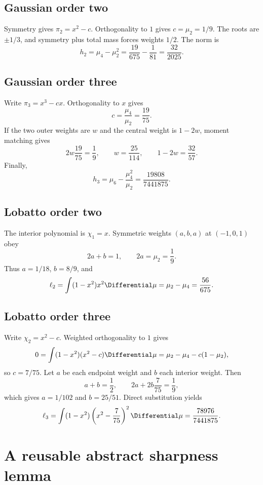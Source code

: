 \documentclass[11pt]{article}
\numberwithin{equation}{section}
\theoremstyle{definition}
\theoremstyle{remark}
\begin{document}
\subsection{Gaussian order two}

Symmetry gives $\pi_2=x^2-c$.  Orthogonality to $1$ gives $c=\mu_2=1/9$.  The roots are $\pm1/3$, and symmetry plus total mass forces weights $1/2$.  The norm is
\[
 h_2=\mu_4-\mu_2^2
 =\frac{19}{675}-\frac1{81}
 =\frac{32}{2025}.
\]

\subsection{Gaussian order three}

Write $\pi_3=x^3-cx$.  Orthogonality to $x$ gives
\[
 c=\frac{\mu_4}{\mu_2}=\frac{19}{75}.
\]
If the two outer weights are $w$ and the central weight is $1-2w$, moment matching gives
\[
 2w\frac{19}{75}=\frac19,
 \qquad
 w=\frac{25}{114},
 \qquad
 1-2w=\frac{32}{57}.
\]
Finally,
\[
 h_3=\mu_6-\frac{\mu_4^2}{\mu_2}
 =\frac{19808}{7441875}.
\]

\subsection{Lobatto order two}

The interior polynomial is $\chi_1=x$.  Symmetric weights $(a,b,a)$ at $(-1,0,1)$ obey
\[
 2a+b=1,
 \qquad
 2a=\mu_2=\frac19.
\]
Thus $a=1/18$, $b=8/9$, and
\[
 \ell_2=\int(1-x^2)x^2\Differential\mu
 =\mu_2-\mu_4
 =\frac{56}{675}.
\]

\subsection{Lobatto order three}

Write $\chi_2=x^2-c$.  Weighted orthogonality to $1$ gives
\[
 0=\int(1-x^2)(x^2-c)\Differential\mu
 =\mu_2-\mu_4-c(1-\mu_2),
\]
so $c=7/75$.  Let $a$ be each endpoint weight and $b$ each interior weight.  Then
\[
 a+b=\frac12,
 \qquad
 2a+2b\frac7{75}=\frac19,
\]
which gives $a=1/102$ and $b=25/51$.  Direct substitution yields
\[
 \ell_3=\int(1-x^2)\left(x^2-\frac7{75}\right)^2\Differential\mu
 =\frac{78976}{7441875}.
\]

\section{A reusable abstract sharpness lemma}
\label{p1:app:abstract-lemma}
\end{document}
